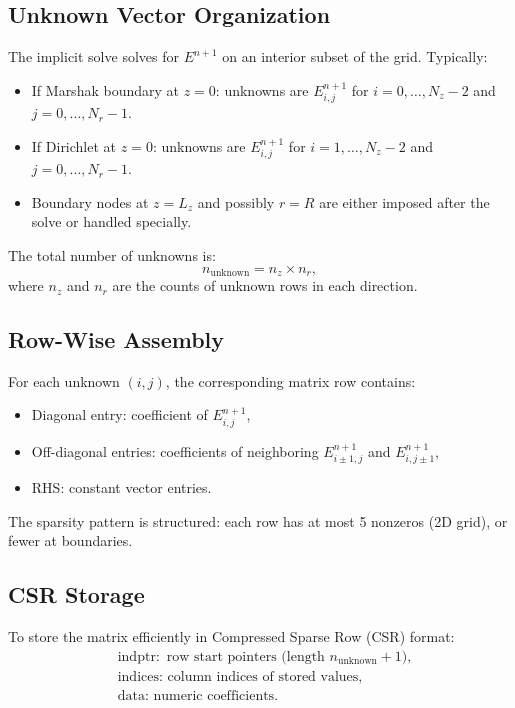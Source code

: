 \documentclass[12pt,oneside]{article}
\begin{document}
\subsection{Unknown Vector Organization}

The implicit solve solves for $E^{n+1}$ on an interior subset of the grid. Typically:
\begin{itemize}
\item If Marshak boundary at $z=0$: unknowns are $E^{n+1}_{i,j}$ for $i=0,\ldots,N_z-2$ and $j=0,\ldots,N_r-1$.
\item If Dirichlet at $z=0$: unknowns are $E^{n+1}_{i,j}$ for $i=1,\ldots,N_z-2$ and $j=0,\ldots,N_r-1$.
\item Boundary nodes at $z=L_z$ and possibly $r=R$ are either imposed after the solve or handled specially.
\end{itemize}

The total number of unknowns is:
\begin{equation}
n_{\text{unknown}} = n_z \times n_r,
\end{equation}
where $n_z$ and $n_r$ are the counts of unknown rows in each direction.

\subsection{Row-Wise Assembly}

For each unknown $(i,j)$, the corresponding matrix row contains:
\begin{itemize}
\item Diagonal entry: coefficient of $E^{n+1}_{i,j}$,
\item Off-diagonal entries: coefficients of neighboring $E^{n+1}_{i\pm1,j}$ and $E^{n+1}_{i,j\pm1}$,
\item RHS: constant vector entries.
\end{itemize}

The sparsity pattern is structured: each row has at most 5 nonzeros (2D grid), or fewer at boundaries.

\subsection{CSR Storage}

To store the matrix efficiently in Compressed Sparse Row (CSR) format:
\begin{align}
&\text{indptr}: \text{ row start pointers (length } n_{\text{unknown}} + 1),\\
&\text{indices}: \text{ column indices of stored values,}\\
&\text{data}: \text{ numeric coefficients.}
\end{align}
\end{document}
